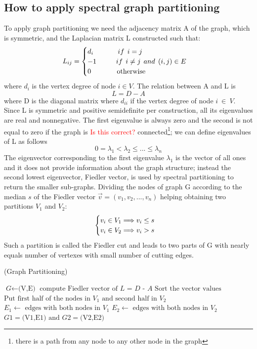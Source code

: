 \documentclass[]{usiinfbachelorproject}
\newcommand\tab[1][1cm]{\hspace*{#1}}
\begin{document}
\subsection{How to apply spectral graph partitioning}
To apply graph partitioning we need the adjacency matrix A of the graph, which is symmetric, and the Laplacian matrix L constructed such that: 
\begin{equation}\notag
L_{ij} = 
\begin{cases}
d_i \tab \:\:\: if \:\: i=j \\
-1 \tab if \:\: i \neq j \:\: and \: \: (i,j) \in E \\
0 \tab \:\:\:\: \text{otherwise}
\end{cases}
\end{equation}
where $d_i$ is the vertex degree of node $i \in V$.
The relation between A and L is
$$L = D - A$$
where D is the diagonal matrix where $d_{ii}$ if the vertex degree of node $i~\in~V$. Since L is symmetric and positive semidefinite per construction, all its eigenvalues are real and nonnegative. The first eigenvalue is always zero and the second is not equal to zero if the graph is \textcolor{red}{Is this correct?} connected\footnote{there is a path from any node to any other node in the graph}; we can define eigenvalues of L as follows
$$ 0 = \lambda_1 < \lambda_2 \leq ... \leq \lambda_n$$
The eigenvector corresponding to the first eigenvalue $\lambda_1$ is the vector of all ones and it does not provide information about the graph structure; instead the second lowest eigenvector, Fiedler vector, is used by spectral partitioning to return the smaller sub-graphs. Dividing the nodes of graph G according to the median $s$ of the Fiedler vector $\vec{v} = (v_1,v_2,...,v_n)$ helping obtaining two partitions $V_1$ and $V_2$:
\begin{equation}\notag
\begin{cases}
v_i \in V_1 \Longrightarrow v_i \leq s \\
v_i \in V_2 \Longrightarrow v_i > s
\end{cases}
\end{equation}
Such a partition is called the Fiedler cut and leads to two parts of G with nearly equals number of vertexes with small number of cutting edges.

\begin{algorithm}
\caption{ (Graph Partitioning)}\label{gpartitioning}
\begin{algorithmic}[1]
\State $\textit{G} \gets \text{(V,E)}$
\State $\text{compute Fiedler vector of } \textit{L = D - A}$
\State $\text{Sort the vector values}$
\State $\text{Put first half of the nodes in } V_1 \text{ and second half in } V_2$
\State $ E_1 \gets \text{ edges with both nodes in } V_1$
\State $ E_2 \gets \text{ edges with both nodes in } V_2$\\
\Return $\textit{G1} = \text{(V1,E1) and } \textit{G2} = \text{(V2,E2)}$
\EndProcedure
\end{algorithmic}
\end{algorithm}
\end{document}
